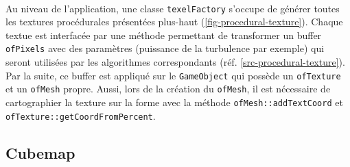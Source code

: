 \paragraph{} Au niveau de l'application, une classe \texttt{texelFactory} s'occupe de générer toutes les textures procédurales présentées plus-haut (\ref{fig-procedural-texture}).  Chaque textue est interfacée par une méthode permettant de transformer un buffer \texttt{ofPixels} avec des paramètres (puissance de la turbulence par exemple) qui seront utilisées par les algorithmes correspondants (réf. \ref{src-procedural-texture}). Par la suite, ce buffer est appliqué sur le \texttt{GameObject} qui possède un \texttt{ofTexture} et un \texttt{ofMesh} propre. Aussi, lors de la création du \texttt{ofMesh}, il est nécessaire de cartographier la texture sur la forme avec la méthode \texttt{ofMesh::addTextCoord} et \texttt{ofTexture::getCoordFromPercent}.
\subsection{Cubemap}